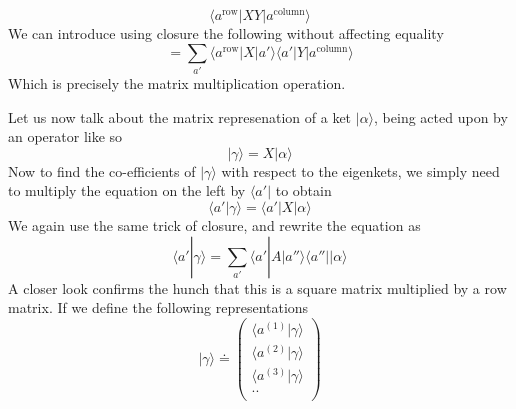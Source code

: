 \documentclass[12pt]{article}
\def\bra#1{\langle#1|}
\def\ket#1{|#1 \rangle}
\def\inpr#1#2{\langle #1|#2 \rangle}
\def\oupr#1#2{| #1 \rangle \langle #2 |}
\def\braket#1#2#3{\langle#1|#2|#3\rangle}
\begin{document}
				\begin{equation}				
					\braket{a^{\text{row}}}{XY}{a^{\text{column}}}
				\end{equation}
				We can introduce using closure the following without affecting equality
				\begin{equation}
					=\sum_{a'} \braket{a^{\text{row}}}{X \oupr{a'}{a'} Y}{a^{\text{column}}}				
				\end{equation}
				Which is precisely the matrix multiplication operation.
				\par
				Let us now talk about the matrix represenation of a ket $\ket \alpha$, being acted upon by an operator like so
				\begin{equation}
					\ket \gamma = X \ket \alpha
				\end{equation}
				Now to find the co-efficients of $\ket \gamma$ with respect to the eigenkets, we simply need to multiply the equation on the left by $\bra {a'}$ to obtain
				\begin{equation}
					\inpr {a'}\gamma = \braket {a'} X  \alpha
				\end{equation}
				We again use the same trick of closure, and rewrite the equation as
				\begin{equation}
					\inpr {a'}\gamma = \sum_{a'} \braket {a'} {A \ket {a''} \bra {a''}}  \alpha
				\end{equation}
				A closer look confirms the hunch that this is a square matrix multiplied by a row matrix. If we define the following representations
				\begin{equation}
				\ket \gamma \doteq
				\left(
				\begin{array}{c}
					\inpr{a^{(1)}}\gamma \\
					\inpr{a^{(2)}}\gamma \\
					\inpr{a^{(3)}}\gamma \\
					.. \\
				\end{array}
				\right)
				\end{equation}
\end{document}
